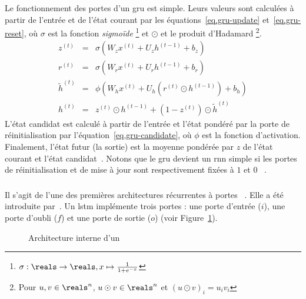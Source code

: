 Le fonctionnement des portes d'un \gls{gru} est simple.
Leurs valeurs sont calculées à partir de l'entrée et de l'état courant par
les équations~\ref{eq.gru-update} et~\ref{eq.gru-reset}, 
où \(\sigma\) est la fonction \emph{sigmoïde}%
\footnote{\(\sigma:\reals\to\reals, x\mapsto\frac{1}{1+e^{-x}}\)}
et \(\odot\) et le produit d'Hadamard%
\footnote{Pour \(u, v\in\reals^n\), \(u\odot v\in\reals^n\) et \((u\odot v)_i = u_i v_i\)}.
\begin{eqnarray}
    \label{eq.gru-update}
    z^{(t)}  &=&\sigma\left(W_z x^{(t)}+U_z h^{(t-1)}+b_z\right) \\
    \label{eq.gru-reset}
    r^{(t)}  &=&\sigma\left(W_r x^{(t)}+U_r h^{(t-1)}+b_r\right) \\
    \label{eq.gru-candidate}
    \tilde{h}^{(t)}  &=&\phi\left(W_h x^{(t)}+U_h\left(r^{(t)} \odot h^{(t-1)}\right)+b_h\right) \\
    \label{eq.gru-out}
    h^{(t)}  &=&z^{(t)} \odot h^{(t-1)}+\left(1-z^{(t)}\right) \odot \tilde{h}^{(t)}
\end{eqnarray}
L'état candidat est calculé à partir de l'entrée et l'état pondéré par la porte de réinitialisation
par l'équation~\ref{eq.gru-candidate}, où \(\phi\) est la fonction d'activation.
Finalement, l'état futur (la sortie) est la moyenne pondérée par \(z\) 
de l'état courant et l'état candidat~\cite{Cho_van_Merrienboer_Bahdanau_Bengio_2014}.
Notons que le \gls{gru} devient un \gls{rnn} simple 
si les portes de réinitialisation et de mise à jour sont respectivement fixées à \(1\) et \(0\)%
~\cite{Fathi_2021}.

\subsubsection{}

Il s'agit de l'une des premières architectures récurrentes à portes%
~\cite{Chung_Gulcehre_Cho_Bengio_2014}.
Elle a été introduite par~\cite{Hochreiter_Schmidhuber_1997}.
Un \gls{lstm} implémente trois portes : 
une porte d'entrée (\(i\)), une porte d'oubli (\(f\)) et une porte de sortie (\(o\))%
(voir Figure~\ref{fig.lstm-circuit}).

\begin{figure}[htb]
    \centering
    \resizebox{8cm}{!}{}
    \caption[Architecture interne d'un ]%
    {Architecture interne d'un ~\cite{Chung_Gulcehre_Cho_Bengio_2014}}
    \label{fig.lstm-circuit}
\end{figure}

